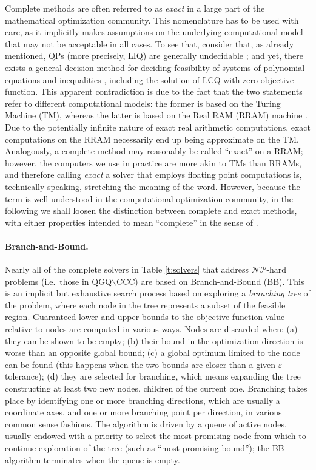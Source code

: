 Complete methods are often referred to as \emph{exact} in a large part of the mathematical optimization community. This nomenclature has to be used with care, as it implicitly makes assumptions on the underlying computational model that may not be acceptable in all cases. To see that, consider that, as already mentioned, QPs (more precisely, LIQ) are generally undecidable \cite{jeroslow}; and yet, there exists a general decision method for deciding feasibility of systems of polynomial equations and inequalities \cite{tarski-reals}, including the solution of LCQ with zero objective function. This apparent contradiction is due to the fact that the two statements refer to different computational models: the former is based on the Turing Machine (TM), whereas the latter is based on the Real RAM (RRAM) machine \cite{blum}. Due to the potentially infinite nature of exact real arithmetic computations, exact computations on the RRAM necessarily end up being approximate on the TM. Analogously, a complete method may reasonably be called ``exact'' on a RRAM; however, the computers we use in practice are more akin to TMs than RRAMs, and therefore calling \emph{exact} a solver that employs floating point computations is, technically speaking, stretching the meaning of the word. However, because the term is well understood in the computational optimization community, in the following we shall loosen the distinction between complete and exact methods, with either properties intended to mean ``complete'' in the sense of \cite{neumaier}.

\paragraph{Branch-and-Bound.}
%
Nearly all of the complete solvers in Table \ref{t:solvers} that address $\mathcal{NP}$-hard problems (i.e.~those in QGQ$\smallsetminus$CCC) are based on Branch-and-Bound (BB). This is an implicit but exhaustive search process based on exploring a \emph{branching tree} of the problem, where each node in the tree represents a subset of the feasible region. Guaranteed lower and upper bounds to the objective function value relative to nodes are computed in various ways. Nodes are discarded when: (a) they can be shown to be empty; (b) their bound in the optimization direction is worse than an opposite global bound; (c) a global optimum limited to the node can be found (this happens when the two bounds are closer than a given $\varepsilon$ tolerance); (d) they are selected for branching, which means expanding the tree constructing at least two new nodes, children of the current one. Branching takes place by identifying one or more branching directions, which are usually a coordinate axes, and one or more branching point per direction, in various common sense fashions. The algorithm is driven by a queue of active nodes, usually endowed with a priority to select the most promising node from which to continue exploration of the tree (such as ``most promising bound''); the BB algorithm terminates when the queue is empty.

